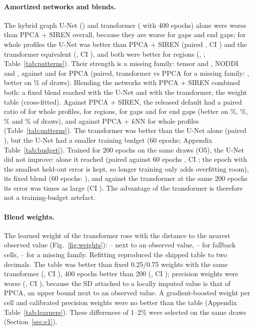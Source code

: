 \documentclass[11pt]{article}
\begin{document}
\paragraph{Amortized networks and blends.} The hybrid graph U-Net (\rUnet) and transformer (\rTfFour{} with 400 epochs)
alone were worse than PPCA + SIREN overall, because they are worse for gaps and end gaps; for whole profiles the U-Net was
better than PPCA + SIREN (paired \pcDWhole, CI \pcDWholeCi) and the transformer equivalent (\pcCWhole, CI \pcCWholeCi),
and both were better for regions (\pcDRegion, \pcCRegion; Table~\ref{tab:patterns}). Their strength is a missing family: tensor \rUnetWdti{} and \rTfFourWdti, NODDI
\rUnetWnoddi{} and \rTfFourWnoddi, against \rPpcaWdti{} and \rPpcaWnoddi{} for PPCA (paired, transformer vs PPCA for a
missing family: \wCRatio, better on \wCBetter\% of draws). Blending the networks with PPCA + SIREN combined both: a fixed
blend reached \rUnetBlend{} with the U-Net and \rTfBlendFour{} with the transformer, the weight table \rFinal{}
(cross-fitted). Against PPCA + SIREN, the released default had a paired ratio of \pcEWhole{} for whole profiles,
\pcERegion{} for regions, \pcEGap{} for gaps and \pcEEnd{} for end gaps (better on \pcEWholeBetter\%, \pcERegionBetter\%,
\pcEGapBetter\% and \pcEEndBetter\% of draws), and against PPCA + $k$NN \pcFWhole{} for whole profiles
(Table~\ref{tab:patterns}). The transformer was better than the U-Net alone (paired \cIRatio), but the U-Net had a smaller
training budget (60 epochs; Appendix Table~\ref{tab:budget}). Trained for 200 epochs on the same draws (O5), the U-Net did
not improve: alone it reached \oFiveUnet{} (paired against 60 epochs \oFiveVsSixty, CI \oFiveVsSixtyCi; the epoch with the
smallest held-out error is kept, so longer training only adds overfitting room), its fixed blend \oFiveBlend{} (60 epochs:
\rUnetBlend), and against the transformer at the same 200 epochs its error was \oFiveVsTf{} times as large (CI \oFiveVsTfCi).
The advantage of the transformer is therefore not a training-budget artefact.

\paragraph{Blend weights.} The learned weight of the transformer rose with the distance to the nearest observed value
(Fig.~\ref{fig:weights}): \wtCNearMin--\wtCNearMax{} next to an observed value, \wtCFarMin--\wtCFarMax{} for fallback
cells, \wtCFamMin--\wtCFamMax{} for a missing family. Refitting reproduced the shipped table to two decimals. The table
was better than fixed 0.25/0.75 weights with the same transformer (\cNRatio, CI \cNBci), 400 epochs better than 200
(\cMRatio, CI \cMBci); precision weights were worse (\cLRatio, CI \cLBci), because the SD attached to a locally imputed
value is that of PPCA, an upper bound next to an observed value. A gradient-boosted weight per cell and calibrated
precision weights were no better than the table (Appendix Table~\ref{tab:learners}). These differences of 1--2\% were
selected on the same draws (Section~\ref{sec:e1}).
\end{document}
